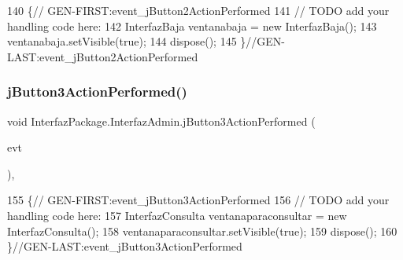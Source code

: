 \begin{DoxyCode}
140                                                                          \{\textcolor{comment}{//
      GEN-FIRST:event\_jButton2ActionPerformed}
141         \textcolor{comment}{// TODO add your handling code here:}
142         InterfazBaja ventanabaja = \textcolor{keyword}{new} InterfazBaja();
143         ventanabaja.setVisible(\textcolor{keyword}{true});
144         dispose();
145     \}\textcolor{comment}{//GEN-LAST:event\_jButton2ActionPerformed}
\end{DoxyCode}
\mbox{\label{class_interfaz_package_1_1_interfaz_admin_a9ac69474400fb921a3fd1118bdd5b5c5}} 
\subsubsection{\texorpdfstring{j\+Button3\+Action\+Performed()}{jButton3ActionPerformed()}}
{\footnotesize\ttfamily void Interfaz\+Package.\+Interfaz\+Admin.\+j\+Button3\+Action\+Performed (\begin{DoxyParamCaption}\item[{java.\+awt.\+event.\+Action\+Event}]{evt }\end{DoxyParamCaption})\hspace{0.3cm}{\ttfamily [inline]}, {\ttfamily [private]}}


\begin{DoxyCode}
155                                                                          \{\textcolor{comment}{//
      GEN-FIRST:event\_jButton3ActionPerformed}
156         \textcolor{comment}{// TODO add your handling code here:}
157         InterfazConsulta ventanaparaconsultar = \textcolor{keyword}{new} InterfazConsulta();
158         ventanaparaconsultar.setVisible(\textcolor{keyword}{true});
159         dispose();
160     \}\textcolor{comment}{//GEN-LAST:event\_jButton3ActionPerformed}
\end{DoxyCode}
\mbox{\label{class_interfaz_package_1_1_interfaz_admin_a181786d770ad10741a8673d921056f35}} 
